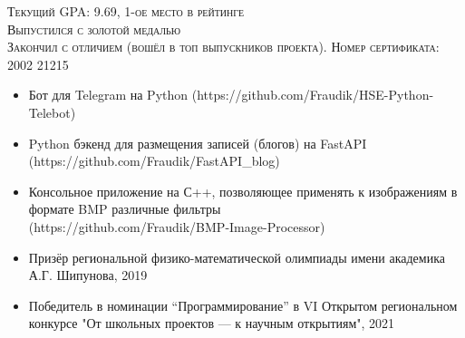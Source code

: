 \documentclass[10pt,a4paper]{altacv}
\begin{document}
\tagline{}

\begin{fullwidth}
\makecvheader
\end{fullwidth}


\textsc{Текущий GPA: 9.69, 1-ое место в рейтинге}
\\
\vspace{10pt}
\textsc{Выпустился с золотой медалью}
\\
\vspace{10pt}
\textsc{Закончил с отличием (вошёл в топ выпускников проекта). Номер сертификата: 2002 21215}
\\
\vspace{10pt}
\textsc{}


\begin{itemize}
\item Бот для Telegram на Python
(https://github.com/Fraudik/HSE-Python-Telebot)
\item Python бэкенд для размещения записей (блогов) на FastAPI
(https://github.com/Fraudik/FastAPI\_blog)
\item  Консольное приложение на С++, позволяющее применять к изображениям в формате BMP различные фильтры \\
(https://github.com/Fraudik/BMP-Image-Processor)
\end{itemize}

\begin{itemize}
\item Призёр региональной физико-математической олимпиады имени академика А.Г. Шипунова, 2019
\item Победитель в номинации “Программирование” в VI Открытом региональном конкурсе "От школьных проектов --- к научным открытиям", 2021
\end{itemize}

\clearpage
\end{document}
